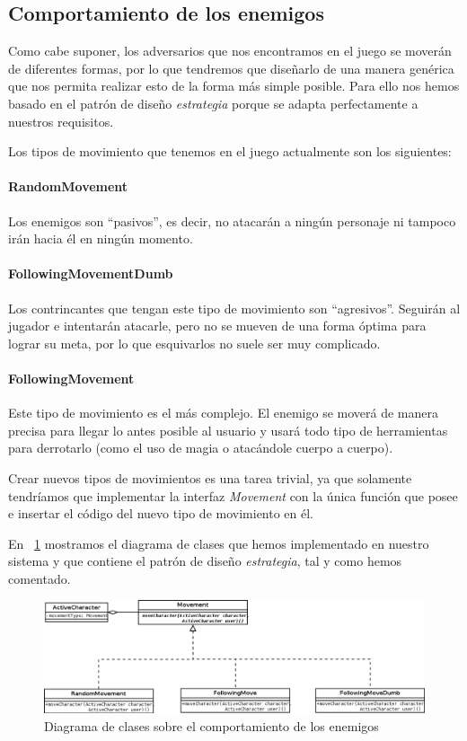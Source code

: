 \subsection{Comportamiento de los enemigos}

Como cabe suponer, los adversarios que nos encontramos en el juego se moverán de diferentes formas, por lo que tendremos que diseñarlo de una manera genérica que nos permita realizar esto de la forma más simple posible.
Para ello nos hemos basado en el patrón de diseño \textit{estrategia} porque se adapta perfectamente a nuestros requisitos.

Los tipos de movimiento que tenemos en el juego actualmente son los siguientes:

\paragraph{RandomMovement} Los enemigos son ``pasivos'', es decir, no atacarán a ningún personaje ni tampoco irán hacia él en ningún momento.

\paragraph{FollowingMovementDumb} Los contrincantes que tengan este tipo de movimiento son ``agresivos''. Seguirán al jugador e intentarán atacarle, pero no se mueven de una forma óptima para lograr su meta, por lo que esquivarlos no suele ser muy complicado.

\paragraph{FollowingMovement} Este tipo de movimiento es el más complejo. El enemigo se moverá de manera precisa para llegar lo antes posible al usuario y usará todo tipo de herramientas para derrotarlo (como el uso de magia o atacándole cuerpo a cuerpo).

Crear nuevos tipos de movimientos es una tarea trivial, ya que solamente tendríamos que implementar la interfaz \textit{Movement} con la única función que posee e insertar el código del nuevo tipo de movimiento en él.

En ~\ref{fig:iaenemy} mostramos el diagrama de clases que hemos implementado en nuestro sistema y que contiene el patrón de diseño \textit{estrategia}, tal y como hemos comentado.

\begin{figure}
    \includegraphics[width=\textwidth,height=\textheight,keepaspectratio]{./img/iaenemy.png}
  \caption{Diagrama de clases sobre el comportamiento de los enemigos}
  \label{fig:iaenemy}
\end{figure}

